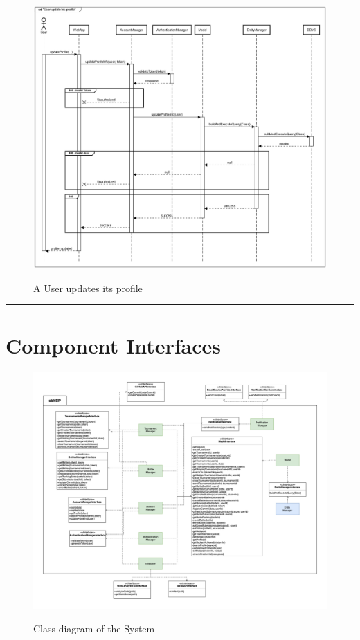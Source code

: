\documentclass{Configuration_Files/Template}
\begin{document}
\begin{figure}[H]
\centering
\includegraphics[scale = 0.33]{Images/diagrams/sequences/updateProfile.png}\\
\caption{A User updates its profile}
\end{figure}

{\color{bluepoli}\rule{\linewidth}{0.1pt}}


\section{Component Interfaces}

\begin{figure}[H]
\centering
\includegraphics[angle=90, scale = 0.4]{Images/diagrams/ComponentSystem.png}\\
\caption{Class diagram of the System}
\end{figure}
\end{document}
